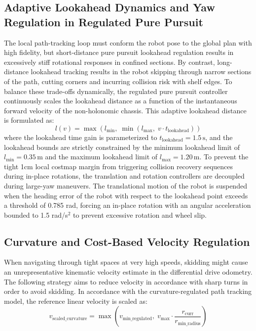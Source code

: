 \subsection{Adaptive Lookahead Dynamics and Yaw Regulation in Regulated Pure Pursuit}

The local path-tracking loop must conform the robot pose to the global plan with high fidelity, but short-distance pure pursuit lookahead regulation results in excessively stiff rotational responses in confined sections. By contrast, long-distance lookahead tracking results in the robot skipping through narrow sections of the path, cutting corners and incurring collision risk with shelf edges. To balance these trade-offs dynamically, the regulated pure pursuit controller continuously scales the lookahead distance as a function of the instantaneous forward velocity of the non-holonomic chassis. This adaptive lookahead distance is formulated as:
\begin{equation}
l(v) = \max\left(l_{\text{min}}, \; \min\left(l_{\text{max}}, \; v \cdot t_{\text{lookahead}}\right)\right) \label{eq:adaptive_lookahead}
\end{equation}
where the lookahead time gain is parameterized to $t_{\text{lookahead}} = 1.5\,\text{s}$, and the lookahead bounds are strictly constrained by the minimum lookahead limit of $l_{\text{min}} = 0.35\,\text{m}$ and the maximum lookahead limit of $l_{\text{max}} = 1.20\,\text{m}$. To prevent the tight 1cm local costmap margin from triggering collision recovery sequences during in-place rotations, the translation and rotation controllers are decoupled during large-yaw maneuvers. The translational motion of the robot is suspended when the heading error of the robot with respect to the lookahead point exceeds a threshold of 0.785 rad, forcing an in-place rotation with an angular acceleration bounded to 1.5 rad/s$^2$ to prevent excessive rotation and wheel slip.

\subsection{Curvature and Cost-Based Velocity Regulation}

When navigating through tight spaces at very high speeds, skidding might cause an unrepresentative kinematic velocity estimate in the differential drive odometry. The following strategy aims to reduce velocity in accordance with sharp turns in order to avoid skidding. In accordance with the curvature-regulated path tracking model, the reference linear velocity is scaled as:
\begin{equation}
v_{\text{scaled\_curvature}} = \max\left(v_{\text{min\_regulated}}, \; v_{\text{max}} \cdot \frac{r_{\text{curr}}}{r_{\text{min\_radius}}}\right) \label{eq:nav2_rpp_curvature_scaling}
\end{equation}

